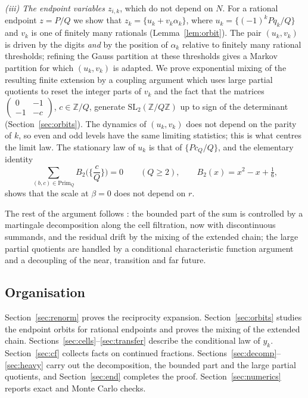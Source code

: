 \documentclass[11pt]{amsart}
\theoremstyle{definition}
\numberwithin{equation}{section}
\newcommand{\Z}{\mathbb{Z}}
\newcommand{\fr}[1]{\{#1\}}
\newcommand{\Prim}{\mathrm{Prim}}
\begin{document}
\emph{(iii) The endpoint variables $z_{i,k}$}, which do not depend on $N$. For a rational endpoint $z=P/Q$ we show that
$z_k=\fr{u_k+v_k\alpha_k}$, where $u_k=\fr{(-1)^kPq_k/Q}$ and $v_k$ is one of finitely many rationals (Lemma~\ref{lem:orbit}). The pair
$(u_k,v_k)$ is driven by the digits \emph{and} by the position of $\alpha_k$ relative to finitely many rational thresholds; refining the
Gauss partition at these thresholds gives a Markov partition for which $(u_k,v_k)$ is adapted. We prove exponential mixing of the resulting
finite extension by a coupling argument which uses large partial quotients to reset the integer parts of $v_k$ and the fact that the
matrices $\left(\begin{smallmatrix}0&-1\\-1&-c\end{smallmatrix}\right)$, $c\in\Z/Q$, generate $\mathrm{SL}_2(\Z/Q\Z)$ up to sign of the
determinant (Section~\ref{sec:orbits}). The dynamics of $(u_k,v_k)$ does not depend on the parity of $k$, so even and odd levels have the
same limiting statistics; this is what centres the limit law. The stationary law of $u_k$ is that of $\fr{Pc_Q/Q}$, and the elementary
identity
\[
\sum_{(b,c)\in\Prim_Q}B_2\Big(\Big\{\frac cQ\Big\}\Big)=0\qquad(Q\ge2),\qquad B_2(x)=x^2-x+\tfrac16,
\]
shows that the scale at $\beta=0$ does not depend on $r$.

The rest of the argument follows \cite{E1002}: the bounded part of the sum is controlled by a martingale decomposition along the cell
filtration, now with discontinuous summands, and the residual drift by the mixing of the extended chain; the large partial quotients are
handled by a conditional characteristic function argument and a decoupling of the near, transition and far future.

\subsection*{Organisation}
Section~\ref{sec:renorm} proves the reciprocity expansion. Section~\ref{sec:orbits} studies the endpoint orbits for rational endpoints and
proves the mixing of the extended chain. Sections~\ref{sec:cells}--\ref{sec:transfer} describe the conditional law of $y_k$.
Section~\ref{sec:cf} collects facts on continued fractions. Sections~\ref{sec:decomp}--\ref{sec:heavy} carry out the decomposition, the
bounded part and the large partial quotients, and Section~\ref{sec:end} completes the proof. Section~\ref{sec:numerics} reports exact and
Monte Carlo checks.
\end{document}
